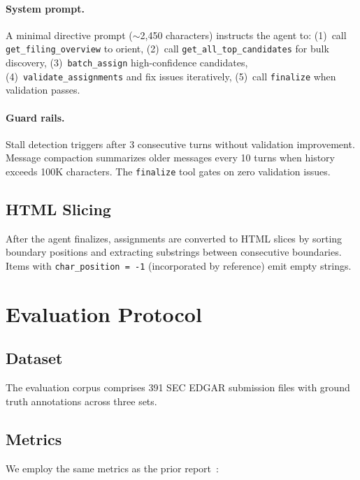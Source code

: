 \documentclass[11pt,a4paper]{article}
\begin{document}
\paragraph{System prompt.} A minimal directive prompt ($\sim$2{,}450 characters) instructs the agent to: (1)~call \texttt{get\_filing\_overview} to orient, (2)~call \texttt{get\_all\_top\_candidates} for bulk discovery, (3)~\texttt{batch\_assign} high-confidence candidates, (4)~\texttt{validate\_assignments} and fix issues iteratively, (5)~call \texttt{finalize} when validation passes.

\paragraph{Guard rails.} Stall detection triggers after 3 consecutive turns without validation improvement. Message compaction summarizes older messages every 10 turns when history exceeds 100K characters. The \texttt{finalize} tool gates on zero validation issues.

\subsection{HTML Slicing}

After the agent finalizes, assignments are converted to HTML slices by sorting boundary positions and extracting substrings between consecutive boundaries. Items with \texttt{char\_position = -1} (incorporated by reference) emit empty strings.


\section{Evaluation Protocol}\label{sec:eval}

\subsection{Dataset}

The evaluation corpus comprises 391 SEC EDGAR submission files with ground truth annotations across three sets.

\subsection{Metrics}

We employ the same metrics as the prior report~\cite{bi2026anchor}:
\end{document}
